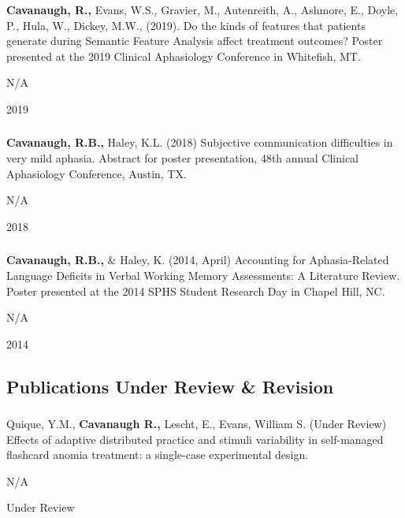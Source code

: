 \documentclass[
]{article}
\begin{document}
\textbf{Cavanaugh, R.,} Evans, W.S., Gravier, M., Autenreith, A.,
Ashmore, E., Doyle, P., Hula, W., Dickey, M.W., (2019). Do the kinds of
features that patients generate during Semantic Feature Analysis affect
treatment outcomes? Poster presented at the 2019 Clinical Aphasiology
Conference in Whitefish, MT.

N/A

2019

\hypertarget{section-21}{%
\subsubsection{}\label{section-21}}

\textbf{Cavanaugh, R.B.,} Haley, K.L. (2018) Subjective communication
difficulties in very mild aphasia. Abstract for poster presentation,
48th annual Clinical Aphasiology Conference, Austin, TX.

N/A

2018

\hypertarget{section-22}{%
\subsubsection{}\label{section-22}}

\textbf{Cavanaugh, R.B.,} \& Haley, K. (2014, April) Accounting for
Aphasia-Related Language Deficits in Verbal Working Memory Assessments:
A Literature Review. Poster presented at the 2014 SPHS Student Research
Day in Chapel Hill, NC.

N/A

2014

\hypertarget{publications-under-review-revision}{%
\subsection{Publications Under Review \&
Revision}\label{publications-under-review-revision}}

\hypertarget{section-23}{%
\subsubsection{}\label{section-23}}

Quique, Y.M., \textbf{Cavanaugh R.,} Lescht, E., Evans, William S.
(Under Review) Effects of adaptive distributed practice and stimuli
variability in self-managed flashcard anomia treatment: a single-case
experimental design.

N/A

Under Review
\end{document}
